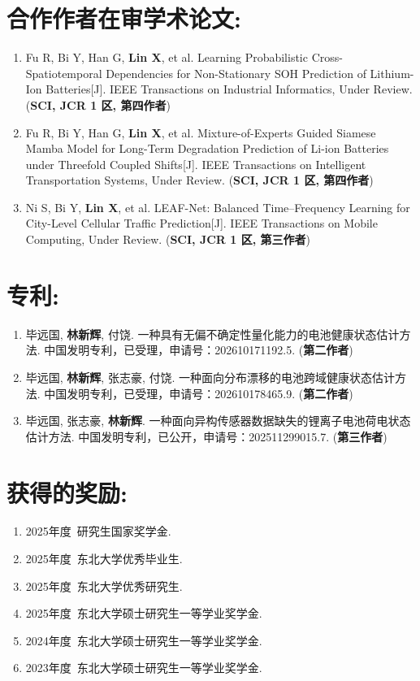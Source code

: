 {    \section*{合作作者在审学术论文:}
    \begin{enumerate}[leftmargin=*]
        \item Fu R, Bi Y, Han G, \textbf{Lin X}, et al. Learning Probabilistic Cross-Spatiotemporal Dependencies for Non-Stationary SOH Prediction of Lithium-Ion Batteries[J]. IEEE Transactions on Industrial Informatics, Under Review. (\textbf{SCI, JCR 1 区, 第四作者})
        \item Fu R, Bi Y, Han G, \textbf{Lin X}, et al. Mixture-of-Experts Guided Siamese Mamba Model for Long-Term Degradation Prediction of Li-ion Batteries under Threefold Coupled Shifts[J]. IEEE Transactions on Intelligent Transportation Systems, Under Review. (\textbf{SCI, JCR 1 区, 第四作者})
        \item Ni S, Bi Y, \textbf{Lin X}, et al. LEAF-Net: Balanced Time–Frequency Learning for City-Level Cellular Traffic Prediction[J]. IEEE Transactions on Mobile Computing, Under Review. (\textbf{SCI, JCR 1 区, 第三作者})
    \end{enumerate}
    \section*{专利:}
    \begin{enumerate}[leftmargin=*]
        \item 毕远国, \textbf{林新辉}, 付饶. 一种具有无偏不确定性量化能力的电池健康状态估计方法. 中国发明专利，已受理，申请号：202610171192.5. (\textbf{第二作者})
        \item 毕远国, \textbf{林新辉}, 张志豪, 付饶. 一种面向分布漂移的电池跨域健康状态估计方法. 中国发明专利，已受理，申请号：202610178465.9. (\textbf{第二作者})
        \item 毕远国, 张志豪, \textbf{林新辉}. 一种面向异构传感器数据缺失的锂离子电池荷电状态估计方法. 中国发明专利，已公开，申请号：202511299015.7. (\textbf{第三作者})
    \end{enumerate}
    \section*{获得的奖励:}
    \begin{enumerate}[leftmargin=*]
        \item 2025年度~研究生国家奖学金.
        \item 2025年度~东北大学优秀毕业生.
        \item 2025年度~东北大学优秀研究生.
        \item 2025年度~东北大学硕士研究生一等学业奖学金.
        \item 2024年度~东北大学硕士研究生一等学业奖学金.
        \item 2023年度~东北大学硕士研究生一等学业奖学金.
    \end{enumerate}
}

\cleardoublepage[plain]%
